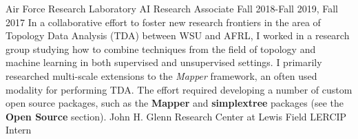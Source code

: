 \documentclass[11pt,a4paper,sans]{moderncv} %
\begin{document}
			 {Air Force Research Laboratory}
			 {AI Research Associate}
			 {Fall 2018-Fall 2019, Fall 2017}{}{\vspace{3pt}
			 In a collaborative effort to foster new research frontiers in the area of Topology Data Analysis (TDA) between WSU and AFRL, I worked in a research group studying how to combine techniques from  the field of topology and machine learning in both supervised and unsupervised settings. I primarily researched multi-scale extensions to the \textit{Mapper} framework, an often used modality for performing TDA. 
The effort required developing a number of custom open source packages, such as the \textbf{Mapper} and \textbf{simplextree} packages (see the \textbf{Open Source} section).  
}
\vspace{0.75em}
			 {John H. Glenn Research Center at Lewis Field}
			 {LERCIP Intern}
\end{document}
